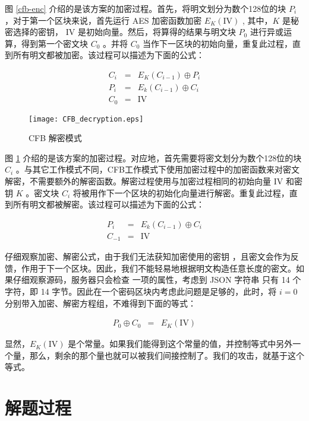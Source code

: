\documentclass[a4paper,UTF8]{ctexart}
\begin{document}
图 \ref{cfb-enc} 介绍的是该方案的加密过程。首先，将明文划分为数个128位的块 $P_i$，对于第一个区块来说，首先运行 AES 加密函数加密 $E_{K}(\mathrm{IV})$ , 其中，$K$ 是秘密选择的密钥， $\mathrm{IV}$ 是初始向量。然后，将算得的结果与明文块 $P_0$ 进行异或运算，得到第一个密文块 $C_0$ 。并将 $C_0$ 当作下一区块的初始向量，重复此过程，直到所有明文都被加密。该过程可以描述为下面的公式：

\begin{eqnarray}
  C_i & = & E_K(C_{i-1}) \oplus P_i \\
  P_i & = & E_k(C_{i-1}) \oplus C_i \\
  C_0 & = & \mathrm{IV}
\end{eqnarray}

\begin{figure}[hbt!]
  \texttt{[image: CFB\_decryption.eps]}
  \caption{CFB 解密模式}\label{cfb-dec}
\end{figure}

图 \ref{cfb-dec} 介绍的是该方案的加密过程。对应地，首先需要将密文划分为数个128位的块 $C_i$ 。与其它工作模式不同，CFB工作模式下使用加密过程中的加密函数来对密文解密，不需要额外的解密函数。解密过程使用与加密过程相同的初始向量 $\mathrm{IV}$ 和密钥 $K$ 。密文块 $C_i$ 将被用作下一个区块的初始化向量进行解密。重复此过程，直到所有明文都被解密。该过程可以描述为下面的公式：

\begin{eqnarray}
  P_i & = & E_k(C_{i-1}) \oplus C_i \\
  C_{-1} & = & \mathrm{IV}
\end{eqnarray}

仔细观察加密、解密公式，由于我们无法获知加密使用的密钥  ，且密文会作为反馈，作用于下一个区块。因此，我们不能轻易地根据明文构造任意长度的密文。如果仔细观察源码，服务器只会检查  一项的属性，考虑到 JSON 字符串  只有 14 个字符，即 14 字节。因此在一个密码区块内考虑此问题是足够的，此时，将 $i=0$ 分别带入加密、解密方程组，不难得到下面的等式：

\begin{eqnarray}
  P_0 \oplus C_0 & = & E_K(\mathrm{IV}) \label{important}
\end{eqnarray}

显然，$E_K(\mathrm{IV})$ 是个常量。如果我们能得到这个常量的值，并控制等式中另外一个量，那么，剩余的那个量也就可以被我们间接控制了。我们的攻击，就基于这个等式。

\section{解题过程}
 
\end{document}
